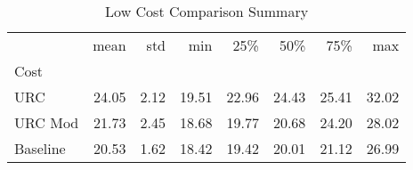 \begin{table}
\caption{Low Cost Comparison Summary}
\begin{tabular}{lrrrrrrr}
\toprule
 & mean & std & min & 25\% & 50\% & 75\% & max \\
Cost &  &  &  &  &  &  &  \\
\midrule
URC & 24.05 & 2.12 & 19.51 & 22.96 & 24.43 & 25.41 & 32.02 \\
URC Mod & 21.73 & 2.45 & 18.68 & 19.77 & 20.68 & 24.20 & 28.02 \\
Baseline & 20.53 & 1.62 & 18.42 & 19.42 & 20.01 & 21.12 & 26.99 \\
\bottomrule
\end{tabular}
\end{table}
